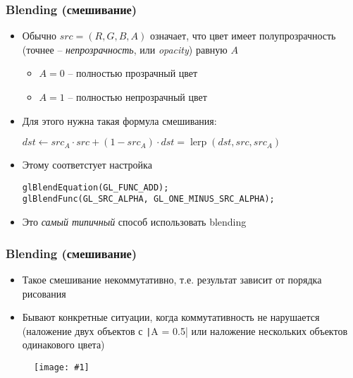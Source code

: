 \documentclass[10pt]{beamer}
\newcommand{\slideimage}[1]{
  \begin{figure}
    \begin{adjustbox}{width=\textwidth, totalheight=\textheight-2\baselineskip-2\baselineskip,keepaspectratio}
      \texttt{[image: \#1]}
    \end{adjustbox}
  \end{figure}
}
\begin{document}
\begin{frame}[fragile]
\frametitle{Blending (смешивание)}
\begin{itemize}
\item Обычно \begin{math}src=(R,G,B,A)\end{math} означает, что цвет имеет полупрозрачность (точнее -- \textit{непрозрачность}, или \textit{opacity}) равную \begin{math}A\end{math}
\begin{itemize}
\item \begin{math}A=0\end{math} -- полностью прозрачный цвет
\item \begin{math}A=1\end{math} -- полностью непрозрачный цвет
\end{itemize}
\pause
\item Для этого нужна такая формула смешивания:
\begin{center}
\begin{math}
dst \leftarrow src_A \cdot src + (1 - src_A) \cdot dst = \operatorname{lerp}(dst, src, src_A)
\end{math}
\end{center}
\pause
\item Этому соответстует настройка
\begin{verbatim}
glBlendEquation(GL_FUNC_ADD);
glBlendFunc(GL_SRC_ALPHA, GL_ONE_MINUS_SRC_ALPHA);
\end{verbatim}
\pause
\item Это \textit{самый типичный} способ использовать blending
\end{itemize}
\end{frame}

\begin{frame}[fragile]
\frametitle{Blending (смешивание)}
\begin{itemize}
\item Такое смешивание некоммутативно, т.е. результат зависит от порядка рисования
\item Бывают конкретные ситуации, когда коммутативность не нарушается (наложение двух объектов с \texttt|A = 0.5| или наложение нескольких объектов одинакового цвета)
\end{itemize}
\slideimage{two-squares.png}
\end{frame}
\end{document}
